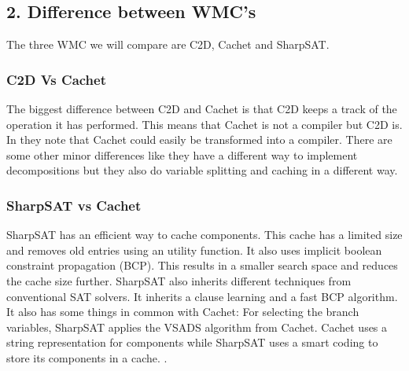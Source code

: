\documentclass[a4paper,10pt]{report}
\begin{document}
\subsection*{2. Difference between WMC's}
The three WMC we will compare are C2D, Cachet and SharpSAT.

\subsubsection*{C2D Vs Cachet}

The biggest difference between C2D and Cachet is that C2D keeps a track of the operation it has performed. This means that Cachet is not a compiler but C2D is. In \cite{CHAVIRA2008772} they note that Cachet could easily be transformed into a compiler. There are some other minor differences like they have a different way to implement decompositions but they also do variable splitting and caching in a different way.


\subsubsection*{SharpSAT vs Cachet}
SharpSAT has an efficient way to cache components. This cache has a limited size and removes old entries using an utility function.
It also uses implicit boolean constraint propagation (BCP). This results in a smaller search space and reduces the cache size further.
SharpSAT also inherits different techniques from conventional SAT solvers. It inherits a clause learning and a fast BCP algorithm. It also has some things in common with Cachet: For selecting the branch variables, SharpSAT applies the VSADS algorithm from Cachet.
Cachet uses a string representation for components while SharpSAT uses a smart coding to store its components in a cache. \cite{SharpSAT}.
\end{document}
